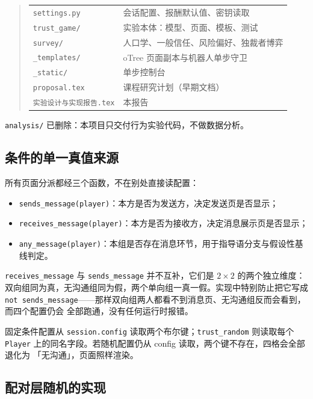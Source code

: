\documentclass[10pt,a4paper]{ctexart}
\newcommand{\code}[1]{\texttt{#1}}
\begin{document}
\begin{quote}\small
\begin{tabular}{ll}
\code{settings.py} & 会话配置、报酬默认值、密钥读取 \\
\code{trust\_game/} & 实验本体：模型、页面、模板、测试 \\
\code{survey/} & 人口学、一般信任、风险偏好、独裁者博弈 \\
\code{\_templates/} & oTree 页面副本与机器人单步守卫 \\
\code{\_static/} & 单步控制台 \\
\code{proposal.tex} & 课程研究计划（早期文档） \\
\code{实验设计与实现报告.tex} & 本报告 \\
\end{tabular}
\end{quote}

\code{analysis/} 已删除：本项目只交付行为实验代码，不做数据分析。

\subsection{条件的单一真值来源}

所有页面分派都经三个函数，不在别处直接读配置：

\begin{itemize}
  \item \code{sends\_message(player)}：本方是否为发送方，决定发送页是否显示；
  \item \code{receives\_message(player)}：本方是否为接收方，决定消息展示页是否显示；
  \item \code{any\_message(player)}：本组是否存在消息环节，用于指导语分支与假设性基线判定。
\end{itemize}

\code{receives\_message} 与 \code{sends\_message} 并不互补，它们是 $2\times2$ 的两个独立维度：
双向组同为真，无沟通组同为假，两个单向组一真一假。实现中特别防止把它写成
\code{not sends\_message}——那样双向组两人都看不到消息页、无沟通组反而会看到，而四个配置仍会
全部跑通，没有任何运行时报错。

固定条件配置从 \code{session.config} 读取两个布尔键；\code{trust\_random} 则读取每个
\code{Player} 上的同名字段。若随机配置仍从 config 读取，两个键不存在，四格会全部退化为
「无沟通」，页面照样渲染。

\subsection{配对层随机的实现}
\end{document}
